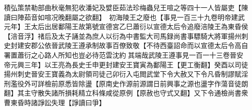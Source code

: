 積弘策禁勒部曲秋毫無犯收潘妃及嬖臣茹法珍梅蟲兒王喧之等四十一人皆屬吏【陳讀曰陣茹音如喧况晚翻屬之欲翻】　初海陵王之廢也【事見一百三十九卷明帝建武元年】王太后出居鄱陽王故第號宣德宮乙巳蕭衍以宣德太后令追廢涪陵王為東昏侯【涪音浮】禇后及太子誦並為庶人以衍為中書監大司馬録尚書事驃騎大將軍揚州刺史封建安郡公依晉武陵王遵承制故事百僚致敬【不待西臺詔命而以宣德太后令高自署置蕭衍之心路人所知也豈必待范雲沈約其端哉武陵王遵事見一百一十三卷晉安帝元興三年】以王亮為長史壬申更封建安王寶寅為鄱陽王【更工衡翻】癸酉以司徒揚州刺史晉安王寶義為太尉領司徒己卯衍入屯閲武堂下令大赦又下令凡昏制謬賦淫刑濫役外可詳檢前原悉皆除盪【原南史作源前源謂日前興事之源也盪字作蕩音徒朗翻】其主守散失諸所損耗精立科條咸從原例【原赦也守式又翻】又下令通檢尚書衆曹東昏時諸諍訟失理【諍讀曰爭】